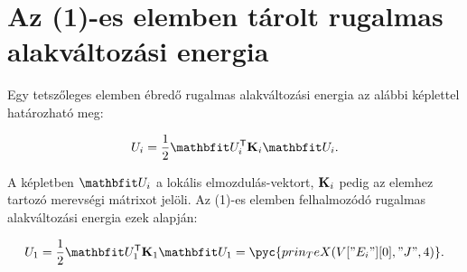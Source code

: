 \section{Az (1)-es elemben tárolt rugalmas alakváltozási energia}

Egy tetszőleges elemben ébredő rugalmas alakváltozási energia az alábbi
képlettel határozható meg:
\begin{myframe}
  \begin{equation}
    U_i = \frac{1}{2} \rvec U_i^{\mathsf T} \rmat K_i \rvec U_i
    \text.
  \end{equation}
\end{myframe}
A képletben $\rvec U_i$ a lokális elmozdulás-vektort, $\mathbf{K}_i$ pedig az
elemhez tartozó merevségi mátrixot jelöli. Az (1)-es elemben felhalmozódó
rugalmas alakváltozási energia ezek alapján:
\begin{myframe}
  \begin{equation}
    U_1
    = \frac{1}{2} \rvec U_1^{\mathsf T} \rmat K_1 \rvec U_1
    = \pyc{prin_TeX(V["E_i"][0], "J", 4)}
    \text.
  \end{equation}
\end{myframe}
